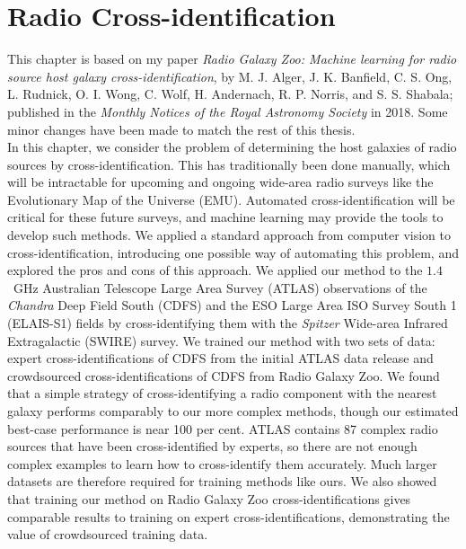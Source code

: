 \chapter{Radio Cross-identification}
\label{cha:cross-id}


This chapter is based on my paper \emph{Radio Galaxy Zoo: Machine learning for radio source host galaxy cross-identification}, by M. J. Alger, J. K. Banfield, C. S. Ong, L. Rudnick, O. I. Wong, C. Wolf, H. Andernach, R. P. Norris, and S. S. Shabala; published in the \emph{Monthly Notices of the Royal Astronomy Society} in 2018. Some minor changes have been made to match the rest of this thesis.\\

In this chapter, we consider the problem of determining the host galaxies of radio sources by cross-identification. This has traditionally been done manually, which will be intractable for upcoming and ongoing wide-area radio surveys like the Evolutionary Map of the Universe (EMU). {Automated cross-identification will be critical for these future surveys, and machine learning may provide the tools to develop such methods. We applied a standard approach from computer vision to cross-identification, introducing one possible way of automating this problem, and explored the pros and cons of this approach}. We applied our method to the $1.4$~GHz Australian Telescope Large Area Survey (ATLAS) observations of the \emph{Chandra} Deep Field South (CDFS) and the ESO Large Area ISO Survey South 1 (ELAIS-S1) fields by cross-identifying them with the \emph{Spitzer} Wide-area Infrared Extragalactic (SWIRE) survey. We trained our method with two sets of data: expert cross-identifications of CDFS from the initial ATLAS data release and crowdsourced cross-identifications of CDFS from Radio Galaxy Zoo. {We found that a simple strategy of cross-identifying a radio component with the nearest galaxy performs comparably to our more complex methods, though our estimated best-case performance is near 100 per cent. ATLAS contains 87 complex radio sources that have been cross-identified by experts, so there are not enough complex examples to learn how to cross-identify them accurately. Much larger datasets are therefore required for training methods like ours. We also showed that training our method on Radio Galaxy Zoo cross-identifications gives comparable results to training on expert cross-identifications, demonstrating the value of crowdsourced training data.}

